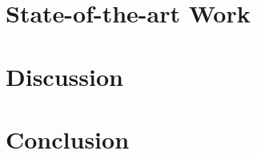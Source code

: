 \documentclass{article}
\begin{document}
\section{State-of-the-art Work}
\section*{Discussion}
\section*{Conclusion}
\nocite{cs229}
\nocite{koller2009probabilistic}
\nocite{pernkopf2014introduction}
\nocite{bishop2006pattern}
\nocite{mitchell1997machine}
\nocite{kimArticle}


\end{document}
